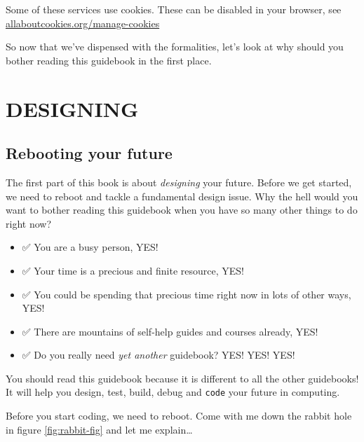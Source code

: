 \documentclass[
]{book}
\providecommand{\tightlist}{%
  \setlength{\itemsep}{0pt}\setlength{\parskip}{0pt}}
\begin{document}
Some of these services use cookies. These can be disabled in your browser, see \href{https://www.allaboutcookies.org/manage-cookies/}{allaboutcookies.org/manage-cookies}

So now that we've dispensed with the formalities, let's look at why should you bother reading this guidebook in the first place.

















\hypertarget{part-designing}{%
\part{DESIGNING}\label{part-designing}}

\hypertarget{rebooting}{%
\chapter{Rebooting your future}\label{rebooting}}

The first part of this book is about \emph{designing} your future. Before we get started, we need to reboot and tackle a fundamental design issue. Why the hell would you want to bother reading this guidebook when you have so many other things to do right now?

\begin{itemize}
\tightlist
\item
  ✅ You are a busy person, YES!
\item
  ✅ Your time is a precious and finite resource, YES!
\item
  ✅ You could be spending that precious time right now in lots of other ways, YES!
\item
  ✅ There are mountains of self-help guides and courses already, YES!
\item
  ✅ Do you really need \emph{yet another} guidebook? YES! YES! YES!
\end{itemize}

You should read this guidebook because it is different to all the other guidebooks! It will help you design, test, build, debug and \texttt{code} your future in computing.

Before you start coding, we need to reboot. Come with me down the rabbit hole in figure \ref{fig:rabbit-fig} and let me explain\ldots{} 🐇
\end{document}
